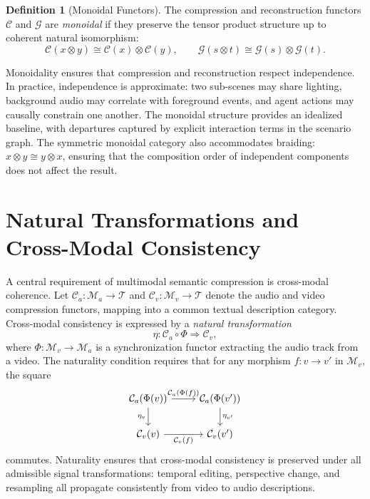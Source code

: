 \documentclass[11pt,a4paper]{article}
\theoremstyle{definition}
\newtheorem{definition}[theorem]{Definition}
\theoremstyle{remark}
\begin{document}
\begin{definition}[Monoidal Functors]
The compression and reconstruction functors $\mathcal{C}$ and $\mathcal{G}$ are \emph{monoidal} if they preserve the tensor product structure up to coherent natural isomorphism:
\[
\mathcal{C}(x \otimes y) \cong \mathcal{C}(x) \otimes \mathcal{C}(y), \qquad \mathcal{G}(s \otimes t) \cong \mathcal{G}(s) \otimes \mathcal{G}(t).
\]
\end{definition}

Monoidality ensures that compression and reconstruction respect independence. In practice, independence is approximate: two sub-scenes may share lighting, background audio may correlate with foreground events, and agent actions may causally constrain one another. The monoidal structure provides an idealized baseline, with departures captured by explicit interaction terms in the scenario graph. The symmetric monoidal category also accommodates braiding: $x \otimes y \cong y \otimes x$, ensuring that the composition order of independent components does not affect the result.

\section{Natural Transformations and Cross-Modal Consistency}
\label{sec:natural}

A central requirement of multimodal semantic compression is cross-modal coherence. Let $\mathcal{C}_a : \mathcal{M}_a \rightarrow \mathcal{T}$ and $\mathcal{C}_v : \mathcal{M}_v \rightarrow \mathcal{T}$ denote the audio and video compression functors, mapping into a common textual description category. Cross-modal consistency is expressed by a \emph{natural transformation}
\[
\eta : \mathcal{C}_a \circ \Phi \Rightarrow \mathcal{C}_v,
\]
where $\Phi : \mathcal{M}_v \rightarrow \mathcal{M}_a$ is a synchronization functor extracting the audio track from a video. The naturality condition requires that for any morphism $f : v \rightarrow v'$ in $\mathcal{M}_v$, the square
\[
\begin{tikzcd}
\mathcal{C}_a(\Phi(v)) \arrow[r, "\mathcal{C}_a(\Phi(f))"] \arrow[d, "\eta_v"'] & \mathcal{C}_a(\Phi(v')) \arrow[d, "\eta_{v'}"] \\
\mathcal{C}_v(v) \arrow[r, "\mathcal{C}_v(f)"'] & \mathcal{C}_v(v')
\end{tikzcd}
\]
commutes. Naturality ensures that cross-modal consistency is preserved under all admissible signal transformations: temporal editing, perspective change, and resampling all propagate consistently from video to audio descriptions.
\end{document}
